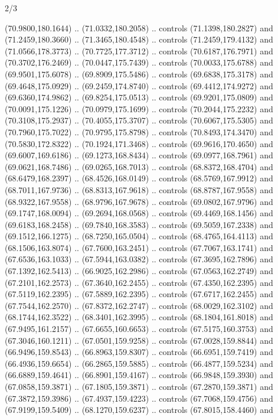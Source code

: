 \begin{flagdescription}{2/3}
\begin{scope}[shift={(0.5\flaglength,0.5)},scale=\flagwidth/320]
\begin{scope}[y=0.8pt, x=0.8pt, yscale=-1,shift={(-118.3,-146)}]
  (70.9800,180.1644) .. (71.0332,180.2058) .. controls (71.1398,180.2827) and
  (71.2459,180.3660) .. (71.3465,180.4548) .. controls (71.2459,179.4132) and
  (71.0566,178.3773) .. (70.7725,177.3712) .. controls (70.6187,176.7971) and
  (70.3702,176.2469) .. (70.0447,175.7439) .. controls (70.0033,175.6788) and
  (69.9501,175.6078) .. (69.8909,175.5486) .. controls (69.6838,175.3178) and
  (69.4648,175.0929) .. (69.2459,174.8740) .. controls (69.4412,174.9272) and
  (69.6360,174.9862) .. (69.8254,175.0513) .. controls (69.9201,175.0809) and
  (70.0091,175.1226) .. (70.0979,175.1699) .. controls (70.2044,175.2232) and
  (70.3108,175.2937) .. (70.4055,175.3707) .. controls (70.6067,175.5305) and
  (70.7960,175.7022) .. (70.9795,175.8798) .. controls (70.8493,174.3470) and
  (70.5830,172.8322) .. (70.1924,171.3468) .. controls (69.9616,170.4650) and
  (69.6007,169.6186) .. (69.1273,168.8434) .. controls (69.0977,168.7961) and
  (69.0621,168.7486) .. (69.0265,168.7013) .. controls (68.8372,168.4704) and
  (68.6479,168.2397) .. (68.4526,168.0149) .. controls (68.5769,167.9912) and
  (68.7011,167.9736) .. (68.8313,167.9618) .. controls (68.8787,167.9558) and
  (68.9322,167.9558) .. (68.9796,167.9678) .. controls (69.0802,167.9796) and
  (69.1747,168.0094) .. (69.2694,168.0568) .. controls (69.4469,168.1456) and
  (69.6183,168.2458) .. (69.7840,168.3583) .. controls (69.5059,167.2338) and
  (69.1512,166.1275) .. (68.7250,165.0504) .. controls (68.4765,164.4113) and
  (68.1506,163.8074) .. (67.7600,163.2451) .. controls (67.7067,163.1741) and
  (67.6536,163.1033) .. (67.5944,163.0382) .. controls (67.3695,162.7896) and
  (67.1392,162.5413) .. (66.9025,162.2986) .. controls (67.0563,162.2749) and
  (67.2101,162.2573) .. (67.3640,162.2455) .. controls (67.4350,162.2395) and
  (67.5119,162.2395) .. (67.5889,162.2395) .. controls (67.6717,162.2455) and
  (67.7544,162.2570) .. (67.8372,162.2747) .. controls (68.0029,162.3102) and
  (68.1744,162.3522) .. (68.3401,162.3995) .. controls (68.1804,161.8018) and
  (67.9495,161.2157) .. (67.6655,160.6653) .. controls (67.5175,160.3753) and
  (67.3046,160.1211) .. (67.0501,159.9258) .. controls (67.0028,159.8844) and
  (66.9496,159.8543) .. (66.8963,159.8307) .. controls (66.6951,159.7419) and
  (66.4936,159.6654) .. (66.2865,159.5885) .. controls (66.4877,159.5234) and
  (66.6889,159.4641) .. (66.8901,159.4167) .. controls (66.9848,159.3930) and
  (67.0858,159.3871) .. (67.1805,159.3871) .. controls (67.2870,159.3871) and
  (67.3872,159.3986) .. (67.4937,159.4223) .. controls (67.7068,159.4756) and
  (67.9199,159.5409) .. (68.1270,159.6237) .. controls (67.8015,158.4460) and

\end{scope}
\end{scope}
\end{flagdescription}
